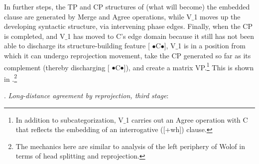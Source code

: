 \documentclass[output=paper
,modfonts
,nonflat]{langsci/langscibook}
\begin{document}
In further steps, the TP and CP structures of (what will become) the
embedded clause are generated by Merge and Agree operations, while V$\_$1 moves up
   the developing syntactic structure, via intervening phase
   edges. Finally, when the CP is completed, and V$\_$1 has moved to C's
   edge domain because it still has not been able to discharge its
   structure-building feature [{\small
    $\bullet$}C{\small $\bullet$}], V$\_$1 is in a position from which it
  can undergo reprojection movement, take the CP generated so far as
  its complement (thereby discharging [{\small
    $\bullet$}C{\small $\bullet$}]), and create a matrix
  VP.\footnote{In addition to subcategorization, V$\_$1 carries out an
    Agree operation with C that reflects the embedding of an
    interrogative ([+wh]) clause.} This is
  shown in \Next.\footnote{The mechanics here are similar to 
    analysis of the left periphery of Wolof
   in terms of head splitting and reprojection.}   

\Lsciexi. {\it Long-distance agreement \label{Baum3}by reprojection, third stage}:
\end{document}
